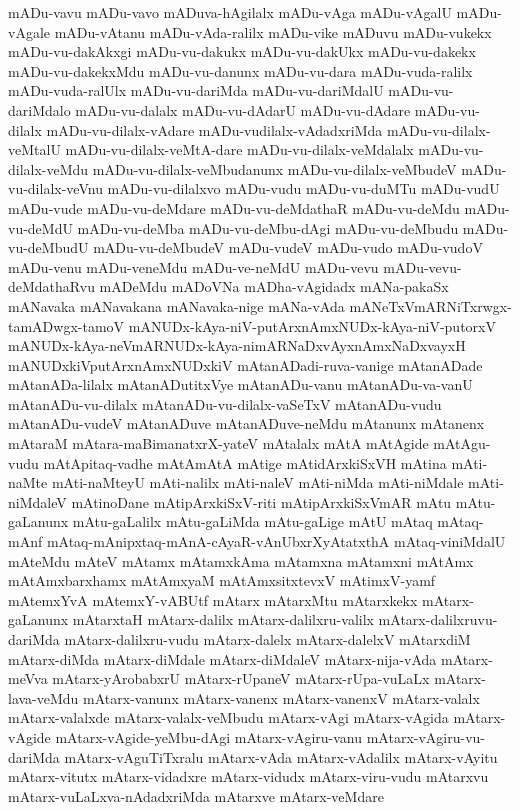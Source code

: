 {mADu-vavu
mADu-vavo
mADuva-hAgilalx
mADu-vAga
mADu-vAgalU
mADu-vAgale
mADu-vAtanu
mADu-vAda-ralilx
mADu-vike
mADuvu
mADu-vukekx
mADu-vu-dakAkxgi
mADu-vu-dakukx
mADu-vu-dakUkx
mADu-vu-dakekx
mADu-vu-dakekxMdu
mADu-vu-danunx
mADu-vu-dara
mADu-vuda-ralilx
mADu-vuda-ralUlx
mADu-vu-dariMda
mADu-vu-dariMdalU
mADu-vu-dariMdalo
mADu-vu-dalalx
mADu-vu-dAdarU
mADu-vu-dAdare
mADu-vu-dilalx
mADu-vu-dilalx-vAdare
mADu-vudilalx-vAdadxriMda
mADu-vu-dilalx-veMtalU
mADu-vu-dilalx-veMtA-dare
mADu-vu-dilalx-veMdalalx
mADu-vu-dilalx-veMdu
mADu-vu-dilalx-veMbudanunx
mADu-vu-dilalx-veMbudeV
mADu-vu-dilalx-veVnu
mADu-vu-dilalxvo
mADu-vudu
mADu-vu-duMTu
mADu-vudU
mADu-vude
mADu-vu-deMdare
mADu-vu-deMdathaR
mADu-vu-deMdu
mADu-vu-deMdU
mADu-vu-deMba
mADu-vu-deMbu-dAgi
mADu-vu-deMbudu
mADu-vu-deMbudU
mADu-vu-deMbudeV
mADu-vudeV
mADu-vudo
mADu-vudoV
mADu-venu
mADu-veneMdu
mADu-ve-neMdU
mADu-vevu
mADu-vevu-deMdathaRvu
mADeMdu
mADoVNa
mADha-vAgidadx
mANa-pakaSx
mANavaka
mANavakana
mANavaka-nige
mANa-vAda
mANeTxVmARNiTxrwgx-tamADwgx-tamoV
mANUDx-kAya-niV-putArxnAmxNUDx-kAya-niV-putorxV
mANUDx-kAya-neVmARNUDx-kAya-nimARNaDxvAyxnAmxNaDxvayxH
mANUDxkiVputArxnAmxNUDxkiV
mAtanADadi-ruva-vanige
mAtanADade
mAtanADa-lilalx
mAtanADutitxVye
mAtanADu-vanu
mAtanADu-va-vanU
mAtanADu-vu-dilalx
mAtanADu-vu-dilalx-vaSeTxV
mAtanADu-vudu
mAtanADu-vudeV
mAtanADuve
mAtanADuve-neMdu
mAtanunx
mAtanenx
mAtaraM
mAtara-maBimanatxrX-yateV
mAtalalx
mAtA
mAtAgide
mAtAgu-vudu
mAtApitaq-vadhe
mAtAmAtA
mAtige
mAtidArxkiSxVH
mAtina
mAti-naMte
mAti-naMteyU
mAti-nalilx
mAti-naleV
mAti-niMda
mAti-niMdale
mAti-niMdaleV
mAtinoDane
mAtipArxkiSxV-riti
mAtipArxkiSxVmAR
mAtu
mAtu-gaLanunx
mAtu-gaLalilx
mAtu-gaLiMda
mAtu-gaLige
mAtU
mAtaq
mAtaq-mAnf
mAtaq-mAnipxtaq-mAnA-cAyaR-vAnUbxrXyAtatxthA
mAtaq-viniMdalU
mAteMdu
mAteV
mAtamx
mAtamxkAma
mAtamxna
mAtamxni
mAtAmx
mAtAmxbarxhamx
mAtAmxyaM
mAtAmxsitxtevxV
mAtimxV-yamf
mAtemxYvA
mAtemxY-vABUtf
mAtarx
mAtarxMtu
mAtarxkekx
mAtarx-gaLanunx
mAtarxtaH
mAtarx-dalilx
mAtarx-dalilxru-valilx
mAtarx-dalilxruvu-dariMda
mAtarx-dalilxru-vudu
mAtarx-dalelx
mAtarx-dalelxV
mAtarxdiM
mAtarx-diMda
mAtarx-diMdale
mAtarx-diMdaleV
mAtarx-nija-vAda
mAtarx-meVva
mAtarx-yArobabxrU
mAtarx-rUpaneV
mAtarx-rUpa-vuLaLx
mAtarx-lava-veMdu
mAtarx-vanunx
mAtarx-vanenx
mAtarx-vanenxV
mAtarx-valalx
mAtarx-valalxde
mAtarx-valalx-veMbudu
mAtarx-vAgi
mAtarx-vAgida
mAtarx-vAgide
mAtarx-vAgide-yeMbu-dAgi
mAtarx-vAgiru-vanu
mAtarx-vAgiru-vu-dariMda
mAtarx-vAguTiTxralu
mAtarx-vAda
mAtarx-vAdalilx
mAtarx-vAyitu
mAtarx-vitutx
mAtarx-vidadxre
mAtarx-vidudx
mAtarx-viru-vudu
mAtarxvu
mAtarx-vuLaLxva-nAdadxriMda
mAtarxve
mAtarx-veMdare
}
